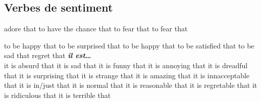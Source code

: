 \subsection*{Verbes de sentiment}

   {adore that}
   {to have the chance that}
   {to fear that}
   {to fear that}

   {to be happy that}
   {to be surprised that}
   {to be happy that}
   {to be satisfied that}
   {to be sad that}
   {regret that}
     {\bf {\em il est}\ldots}\\
        {it is absurd that}
        {it is sad that}
        {it is funny that}
        {it is annoying that}
        {it is dreadful that}
        {it is surprising that}
        {it is strange that}
        {it is amazing that}
        {it is innacceptable that}
        {it is in/just that}
        {it is normal that}
        {it is reasonable that}
        {it is regretable that}
        {it is ridiculous that}
        {it is terrible that}
